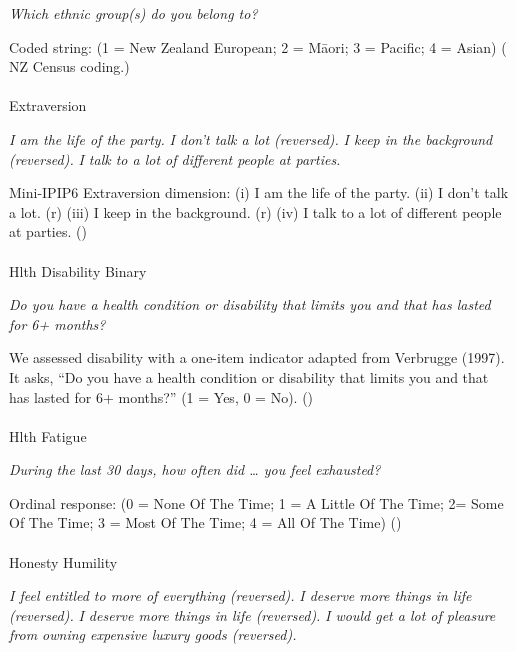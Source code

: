 \documentclass[
  single column]{article}
\makeatletter
\let\oldparagraph\paragraph
\renewcommand{\paragraph}{
    \@ifstar
      \xxxParagraphStar
      \xxxParagraphNoStar
  }
\newcommand{\xxxParagraphStar}[1]{\oldparagraph*{#1}\mbox{}}
\newcommand{\xxxParagraphNoStar}[1]{\oldparagraph{#1}\mbox{}}
\makeatother
\begin{document}
\emph{Which ethnic group(s) do you belong to?}

Coded string: (1 = New Zealand European; 2 = Māori; 3 = Pacific; 4 =
Asian) ( NZ Census
coding.)

\paragraph{Extraversion}\label{extraversion}

\emph{I am the life of the party.} \emph{I don't talk a lot (reversed).}
\emph{I keep in the background (reversed).} \emph{I talk to a lot of
different people at parties.}

Mini-IPIP6 Extraversion dimension: (i) I am the life of the party. (ii)
I don't talk a lot. (r) (iii) I keep in the background. (r) (iv) I talk
to a lot of different people at parties.
()

\paragraph{Hlth Disability Binary}\label{hlth-disability-binary}

\emph{Do you have a health condition or disability that limits you and
that has lasted for 6+ months?}

We assessed disability with a one-item indicator adapted from Verbrugge
(1997). It asks, ``Do you have a health condition or disability that
limits you and that has lasted for 6+ months?'' (1 = Yes, 0 = No).
()

\paragraph{Hlth Fatigue}\label{hlth-fatigue}

\emph{During the last 30 days, how often did \ldots{} you feel
exhausted?}

Ordinal response: (0 = None Of The Time; 1 = A Little Of The Time; 2=
Some Of The Time; 3 = Most Of The Time; 4 = All Of The Time)
()

\paragraph{Honesty Humility}\label{honesty-humility}

\emph{I feel entitled to more of everything (reversed).} \emph{I deserve
more things in life (reversed).} \emph{I deserve more things in life
(reversed).} \emph{I would get a lot of pleasure from owning expensive
luxury goods (reversed).}
\end{document}
